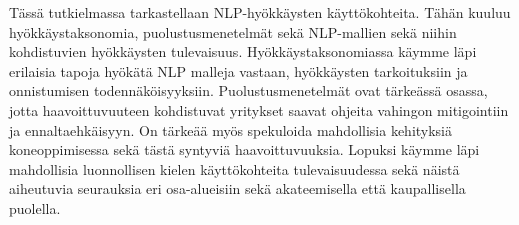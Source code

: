 Tässä tutkielmassa tarkastellaan NLP-hyökkäysten käyttökohteita. Tähän kuuluu hyökkäystaksonomia, puolustusmenetelmät sekä NLP-mallien sekä niihin kohdistuvien hyökkäysten tulevaisuus. Hyökkäystaksonomiassa käymme läpi erilaisia tapoja hyökätä NLP\- malleja vastaan, hyökkäysten tarkoituksiin ja onnistumisen todennäköisyyksiin. Puolustusmenetelmät ovat tärkeässä osassa, jotta haavoittuvuuteen kohdistuvat yritykset saavat ohjeita vahingon mitigointiin ja ennaltaehkäisyyn. On tärkeää myös spekuloida mahdollisia kehityksiä koneoppimisessa sekä tästä syntyviä haavoittuvuuksia. Lopuksi käymme läpi mahdollisia luonnollisen kielen käyttökohteita tulevaisuudessa sekä näistä aiheutuvia seurauksia eri osa-alueisiin sekä akateemisella että kaupallisella puolella.